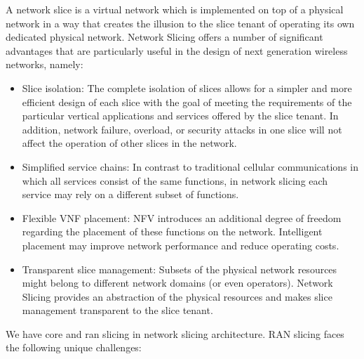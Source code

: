 \documentclass[conference]{IEEEtran}
\begin{document}
A network slice is a virtual network which is implemented on top
of a physical network in a way that creates the illusion to the
slice tenant of operating its own dedicated physical network.
Network Slicing offers a number of significant advantages
that are particularly useful in the design of next generation
wireless networks, namely:
\begin{itemize}
\item  Slice isolation: The complete isolation of slices allows
for a simpler and more efficient design of each slice with
the goal of meeting the requirements of the particular
vertical applications and services offered by the slice
tenant. In addition, network failure, overload, or security
attacks in one slice will not affect the operation of other
slices in the network.
\item Simplified service chains: In contrast to traditional cellular communications in which all services consist of the
same functions, in network slicing each service may rely on a different subset of functions.
\item Flexible VNF placement: NFV introduces an additional
degree of freedom regarding the placement of these functions on the network. Intelligent placement may improve
network performance and reduce operating costs.
\item Transparent slice management: Subsets of the physical
network resources might belong to different network
domains (or even operators). Network Slicing provides
an abstraction of the physical resources and makes slice
management transparent to the slice tenant.
\end{itemize}
We have core and ran slicing in network slicing architecture.
RAN slicing faces the following unique challenges: 
\end{document}
